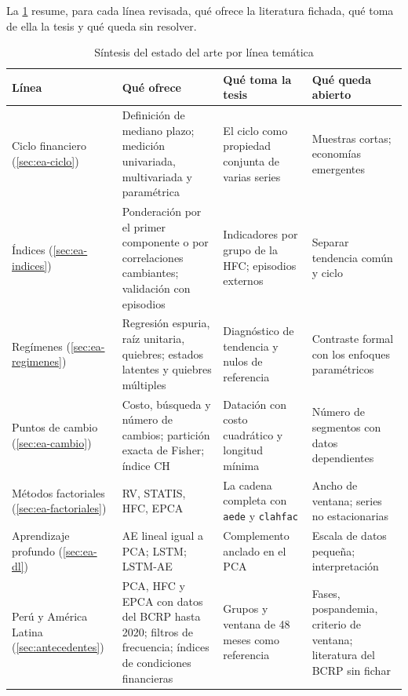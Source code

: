 La \cref{tab:sintesis-ea} resume, para cada línea revisada, qué ofrece la literatura fichada, qué
toma de ella la tesis y qué queda sin resolver.

\begin{table}[htbp]
\centering
\small
\caption{Síntesis del estado del arte por línea temática}
\label{tab:sintesis-ea}
\begin{tabular}{@{}>{\raggedright\arraybackslash}p{}>{\raggedright\arraybackslash}p{}>{\raggedright\arraybackslash}p{}>{\raggedright\arraybackslash}p{}@{}}
\toprule
Línea & Qué ofrece & Qué toma la tesis & Qué queda abierto \\
\midrule
Ciclo financiero (\cref{sec:ea-ciclo}) & Definición de mediano plazo; medición univariada,
  multivariada y paramétrica &
  El ciclo como propiedad conjunta de varias series & Muestras cortas; economías emergentes \\
Índices (\cref{sec:ea-indices}) & Ponderación por el primer componente o por correlaciones
  cambiantes; validación con episodios & Indicadores por grupo de la HFC; episodios externos &
  Separar tendencia común y ciclo \\
Regímenes (\cref{sec:ea-regimenes}) & Regresión espuria, raíz unitaria, quiebres; estados
  latentes y quiebres múltiples & Diagnóstico de tendencia y nulos de referencia & Contraste
  formal con los enfoques paramétricos \\
Puntos de cambio (\cref{sec:ea-cambio}) & Costo, búsqueda y número de cambios; partición exacta
  de Fisher; índice CH & Datación con costo cuadrático y longitud mínima & Número de segmentos con
  datos dependientes \\
Métodos factoriales (\cref{sec:ea-factoriales}) & RV, STATIS, HFC, EPCA & La cadena completa con
  \texttt{aede} y \texttt{clahfac} & Ancho de ventana; series no estacionarias \\
Aprendizaje profundo (\cref{sec:ea-dl}) & AE lineal igual a PCA; LSTM; LSTM-AE & Complemento
  anclado en el PCA & Escala de datos pequeña; interpretación \\
Perú y América Latina (\cref{sec:antecedentes}) & PCA, HFC y EPCA con datos del BCRP hasta
  2020; filtros de frecuencia; índices de condiciones financieras & Grupos y ventana de 48 meses
  como referencia & Fases, pospandemia, criterio de ventana; literatura del BCRP sin fichar \\
\bottomrule
\end{tabular}
\end{table}

